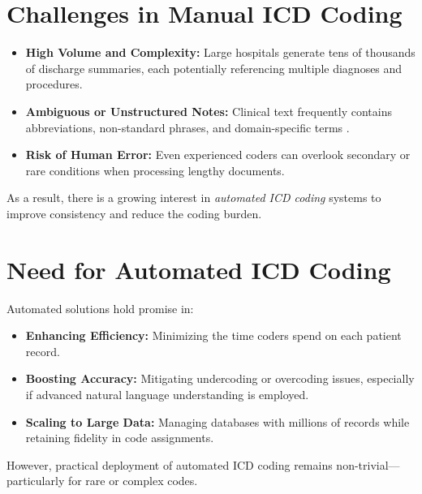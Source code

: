 \section{Challenges in Manual ICD Coding}
\begin{itemize}
    \item \textbf{High Volume and Complexity:} Large hospitals generate tens of thousands of discharge summaries, each potentially referencing multiple diagnoses and procedures.
    \item \textbf{Ambiguous or Unstructured Notes:} Clinical text frequently contains abbreviations, non-standard phrases, and domain-specific terms \cite{wrenn2010quantifying}.
    \item \textbf{Risk of Human Error:} Even experienced coders can overlook secondary or rare conditions when processing lengthy documents.
\end{itemize}
As a result, there is a growing interest in \textit{automated ICD coding} systems to improve consistency and reduce the coding burden.

\section{Need for Automated ICD Coding}
Automated solutions hold promise in:
\begin{itemize}
    \item \textbf{Enhancing Efficiency:} Minimizing the time coders spend on each patient record.
    \item \textbf{Boosting Accuracy:} Mitigating undercoding or overcoding issues, especially if advanced natural language understanding is employed.
    \item \textbf{Scaling to Large Data:} Managing databases with millions of records while retaining fidelity in code assignments.
\end{itemize}
However, practical deployment of automated ICD coding remains non-trivial—particularly for rare or complex codes.

